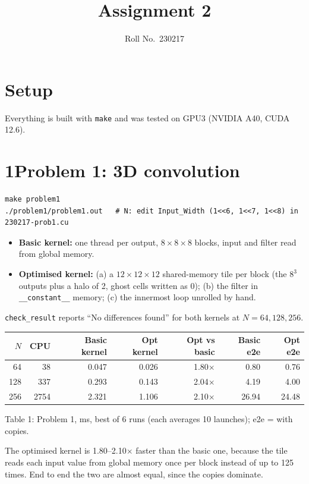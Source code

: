 \documentclass[11pt]{article}
\title{Assignment 2}
\author{Roll No.\ 230217}
\date{}
\begin{document}
\maketitle

\section*{Setup}
Everything is built with \texttt{make} and was tested on GPU3 (NVIDIA A40, CUDA 12.6).

\section*{1\quad Problem 1: 3D convolution}
\begin{Verbatim}[frame=single,fontsize=\footnotesize]
make problem1
./problem1/problem1.out   # N: edit Input_Width (1<<6, 1<<7, 1<<8) in 230217-prob1.cu
\end{Verbatim}
\begin{itemize}
\item \textbf{Basic kernel:} one thread per output, $8\times8\times8$ blocks, input
 and filter read from global memory.
\item \textbf{Optimised kernel:} (a) a $12\times12\times12$ shared-memory tile per
 block (the $8^3$ outputs plus a halo of 2, ghost cells written as 0); (b) the
 filter in \texttt{\_\_constant\_\_} memory; (c) the innermost loop unrolled by hand.
\end{itemize}
\texttt{check\_result} reports ``No differences found'' for both kernels at
$N=64,128,256$.

\begin{center}
\begin{tabular}{rrrrrrr}
\toprule
$N$ & CPU & Basic kernel & Opt kernel & Opt vs basic & Basic e2e & Opt e2e \\
\midrule
64  & 38  & 0.047  & 0.026  & 1.80$\times$  & 0.80  & 0.76 \\
128 & 337 & 0.293 & 0.143 & 2.04$\times$ & 4.19 & 4.00 \\
256 & 2754 & 2.321 & 1.106 & 2.10$\times$ & 26.94 & 24.48 \\
\bottomrule
\end{tabular}

\smallskip
{\small Table 1: Problem 1, ms, best of 6 runs (each averages 10 launches); e2e = with copies.}
\end{center}

The optimised kernel is 1.80--2.10$\times$ faster than the basic one, because the
tile reads each input value from global memory once per block instead of up to
125 times. End to end the two are almost equal, since the copies dominate.
\end{document}
